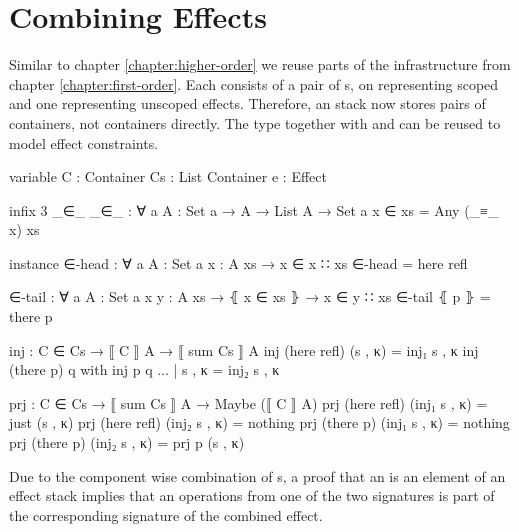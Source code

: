 

\section{Combining Effects}

Similar to chapter \ref{chapter:higher-order} we reuse parts of the
infrastructure from chapter \ref{chapter:first-order}.
Each  consists of a pair of s, on
representing scoped and one representing unscoped effects.
Therefore, an  stack now stores pairs of containers, not
containers directly.
The type  together with  and
 can be reused to model effect constraints.

\begin{code}[hide]
variable
  C  : Container
  Cs : List Container
  e : Effect
\end{code}

\begin{code}[hide] %
infix 3 _∈_
_∈_ : ∀ {a} {A : Set a} → A → List A → Set a
x ∈ xs = Any (_≡_ x) xs

instance
  ∈-head : ∀ {a} {A : Set a} {x : A} {xs} → x ∈ x ∷ xs
  ∈-head = here refl

  ∈-tail : ∀ {a} {A : Set a} {x y : A} {xs} → ⦃ x ∈ xs ⦄ → x ∈ y ∷ xs
  ∈-tail ⦃ p ⦄ = there p

inj : C ∈ Cs → ⟦ C ⟧ A → ⟦ sum Cs ⟧ A
inj (here refl) (s , κ) = inj₁ s , κ
inj (there p)   q       with inj p q
... | s , κ = inj₂ s , κ

prj : C ∈ Cs → ⟦ sum Cs ⟧ A → Maybe (⟦ C ⟧ A)
prj (here refl) (inj₁ s , κ) = just (s , κ)
prj (here refl) (inj₂ s , κ) = nothing
prj (there p)   (inj₁ s , κ) = nothing
prj (there p)   (inj₂ s , κ) = prj p (s , κ)
\end{code}
Due to the component wise combination of s, a proof that an
 is an element of an effect stack implies that an
operations from one of the two signatures is part of the corresponding
signature of the combined effect.


